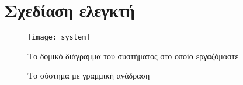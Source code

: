 \newcommand{\kone}{\frac{-k_m}{T_m s + 1}}
\newcommand{\ktwo}{k_{\mu}}
\newcommand{\kthree}{\frac{k_0}{s}}
\section{Σχεδίαση ελεγκτή}
\begin{figure}[htb]
    \centering
    \texttt{[image: system]}
    \caption{Το δομικό διάγραμμα του συστήματος στο οποίο εργαζόμαστε}
    \label{fig:system}
\end{figure}

\begin{figure}[htb]
\centering

\caption{Το σύστημα με γραμμική ανάδραση}\label{fig:system-feedback}
\end{figure}
